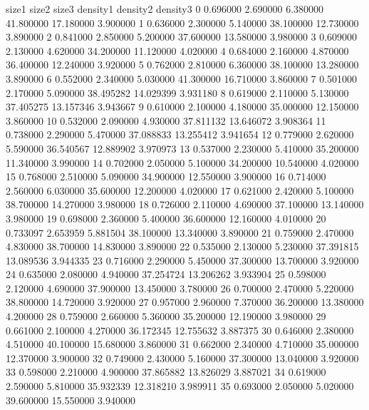 \documentclass[letterpaper,10pt,english]{jupyterBook}
\begin{document}
\begin{sphinxVerbatim}[commandchars=\\\{\}]
       size1     size2     size3   density1   density2  density3
0   0.696000  2.690000  6.380000  41.800000  17.180000  3.900000
1   0.636000  2.300000  5.140000  38.100000  12.730000  3.890000
2   0.841000  2.850000  5.200000  37.600000  13.580000  3.980000
3   0.609000  2.130000  4.620000  34.200000  11.120000  4.020000
4   0.684000  2.160000  4.870000  36.400000  12.240000  3.920000
5   0.762000  2.810000  6.360000  38.100000  13.280000  3.890000
6   0.552000  2.340000  5.030000  41.300000  16.710000  3.860000
7   0.501000  2.170000  5.090000  38.495282  14.029399  3.931180
8   0.619000  2.110000  5.130000  37.405275  13.157346  3.943667
9   0.610000  2.100000  4.180000  35.000000  12.150000  3.860000
10  0.532000  2.090000  4.930000  37.811132  13.646072  3.908364
11  0.738000  2.290000  5.470000  37.088833  13.255412  3.941654
12  0.779000  2.620000  5.590000  36.540567  12.889902  3.970973
13  0.537000  2.230000  5.410000  35.200000  11.340000  3.990000
14  0.702000  2.050000  5.100000  34.200000  10.540000  4.020000
15  0.768000  2.510000  5.090000  34.900000  12.550000  3.900000
16  0.714000  2.560000  6.030000  35.600000  12.200000  4.020000
17  0.621000  2.420000  5.100000  38.700000  14.270000  3.980000
18  0.726000  2.110000  4.690000  37.100000  13.140000  3.980000
19  0.698000  2.360000  5.400000  36.600000  12.160000  4.010000
20  0.733097  2.653959  5.881504  38.100000  13.340000  3.890000
21  0.759000  2.470000  4.830000  38.700000  14.830000  3.890000
22  0.535000  2.130000  5.230000  37.391815  13.089536  3.944335
23  0.716000  2.290000  5.450000  37.300000  13.700000  3.920000
24  0.635000  2.080000  4.940000  37.254724  13.206262  3.933904
25  0.598000  2.120000  4.690000  37.900000  13.450000  3.780000
26  0.700000  2.470000  5.220000  38.800000  14.720000  3.920000
27  0.957000  2.960000  7.370000  36.200000  13.380000  4.200000
28  0.759000  2.660000  5.360000  35.200000  12.190000  3.980000
29  0.661000  2.100000  4.270000  36.172345  12.755632  3.887375
30  0.646000  2.380000  4.510000  40.100000  15.680000  3.860000
31  0.662000  2.340000  4.710000  35.000000  12.370000  3.900000
32  0.749000  2.430000  5.160000  37.300000  13.040000  3.920000
33  0.598000  2.210000  4.900000  37.865882  13.826029  3.887021
34  0.619000  2.590000  5.810000  35.932339  12.318210  3.989911
35  0.693000  2.050000  5.020000  39.600000  15.550000  3.940000
\end{sphinxVerbatim}
\end{document}
